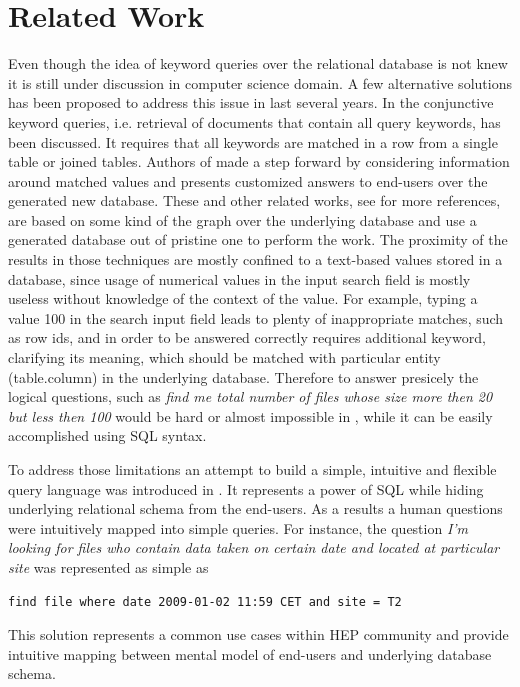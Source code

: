 \documentclass[1p,times]{elsarticle}
\begin{document}

\section{Related Work\label{RelatedWork}}
Even though the idea of keyword queries over the relational database
is not knew it is still under discussion in computer science domain.
A few alternative solutions has been proposed to address this issue
in last several years. In \cite{DBXplorer} the conjunctive keyword queries,
i.e. retrieval of documents that contain all query keywords, has
been discussed. It requires that all keywords are matched in a row from a
single table or joined tables. Authors of \cite{QueryAnswer} made a step forward
by considering information around matched values and presents customized answers to
end-users over the generated new database. These and other related 
works, see \cite{DBXplorer, QueryAnswer} for more references,
are based on some kind of the graph over the underlying database and
use a generated database out of pristine one to perform the work.
The proximity of the results in those techniques 
are mostly confined to a text-based values stored in a database, since 
usage of numerical values in the input search field is mostly useless without 
knowledge of the context of the value. For example, typing a value 100 
in the search input field leads to plenty of inappropriate matches, 
such as row ids, and in order to be
answered correctly requires additional keyword, clarifying its meaning, 
which should be matched with particular
entity (table.column) in the underlying database.
Therefore to answer presicely the logical questions, such as  
{\it find me total number of files whose size more then 20 but less then 
100} would be hard or almost impossible in \cite{DBXplorer, QueryAnswer}, 
while it can be easily accomplished using SQL syntax. 

To address those limitations an attempt to build a simple, intuitive and 
flexible query language was introduced in \cite{DBS-QL}.
It represents a power of SQL while hiding underlying relational schema from 
the end-users. As a results a human questions were intuitively mapped into 
simple queries. For instance, the question
{\it I'm looking for files who contain data taken on certain date and located at
particular site} was represented as simple as \cite{DBS-QL}
\begin{verbatim}
find file where date 2009-01-02 11:59 CET and site = T2
\end{verbatim}
This solution represents a common use cases within HEP community and provide
intuitive mapping between mental model of end-users and underlying database schema.
\end{document}

